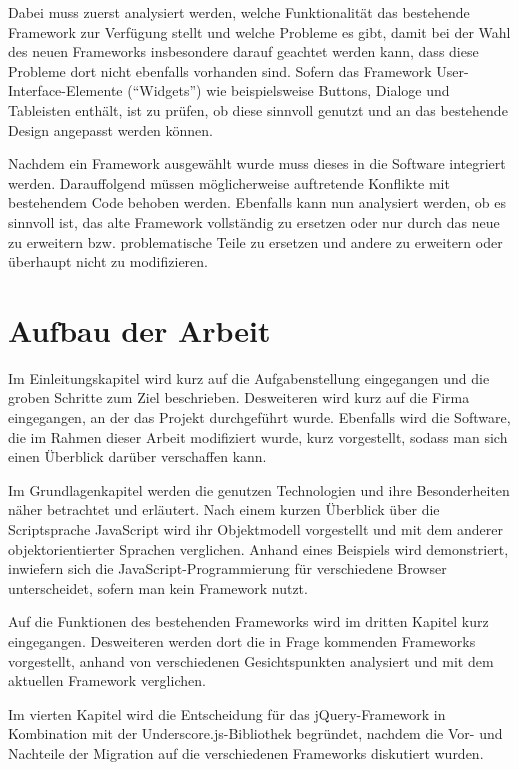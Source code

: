 Dabei muss zuerst analysiert werden, welche Funktionalität das bestehende Framework zur Verfügung
stellt und welche Probleme es gibt, damit bei der Wahl des neuen Frameworks insbesondere darauf
geachtet werden kann, dass diese Probleme dort nicht ebenfalls vorhanden sind. Sofern das Framework
User-Interface-Elemente (\enquote{Widgets}) wie beispielsweise Buttons, Dialoge und Tableisten
enthält, ist zu prüfen, ob diese sinnvoll genutzt und an das bestehende Design angepasst werden können.

Nachdem ein Framework ausgewählt wurde muss dieses in die Software integriert werden. Darauffolgend
müssen möglicherweise auftretende Konflikte mit bestehendem Code behoben werden.
Ebenfalls kann nun analysiert werden, ob es sinnvoll ist, das alte Framework vollständig zu ersetzen
oder nur durch das neue zu erweitern bzw. problematische Teile zu ersetzen und andere zu erweitern
oder überhaupt nicht zu modifizieren.


\section{Aufbau der Arbeit}

Im Einleitungskapitel wird kurz auf die Aufgabenstellung eingegangen und die groben Schritte zum
Ziel beschrieben. Desweiteren wird kurz auf die Firma eingegangen, an der das Projekt durchgeführt
wurde.
Ebenfalls wird die Software, die im Rahmen dieser Arbeit modifiziert wurde, kurz vorgestellt, sodass
man sich einen Überblick darüber verschaffen kann.

Im Grundlagenkapitel werden die genutzen Technologien und ihre Besonderheiten näher betrachtet und
erläutert. Nach einem kurzen Überblick über die Scriptsprache JavaScript wird ihr Objektmodell
vorgestellt und mit dem anderer objektorientierter Sprachen verglichen. Anhand eines Beispiels wird
demonstriert, inwiefern sich die JavaScript-Programmierung für verschiedene Browser unterscheidet,
sofern man kein Framework nutzt.

Auf die Funktionen des bestehenden Frameworks wird im dritten Kapitel kurz eingegangen. Desweiteren
werden dort die in Frage kommenden Frameworks vorgestellt, anhand von verschiedenen Gesichtspunkten
analysiert und mit dem aktuellen Framework verglichen.

Im vierten Kapitel wird die Entscheidung für das jQuery-Framework in Kombination mit der
Underscore.js-Bibliothek begründet, nachdem die Vor- und Nachteile der Migration auf die
verschiedenen Frameworks diskutiert wurden.

